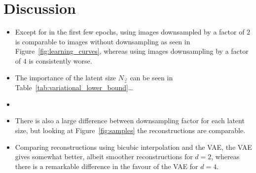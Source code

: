 \section{Discussion}
\label{sec:discussion}

\begin{itemize}
	\item Except for in the first few epochs, using images downsampled by a factor of $2$ is comparable to images without downsampling as seen in Figure~\ref{fig:learning_curves}, whereas using images downsampling by a factor of $4$ is consistently worse.
	\item The importance of the latent size $N_{\vec{z}}$ can be seen in Table~\ref{tab:variational_lower_bound}\dots
	\item {}
	\item There is also a large difference between downsampling factor for each latent size, but looking at Figure~\ref{fig:samples} the reconstructions are comparable.
	\item Comparing reconstructions using bicubic interpolation and the VAE, the VAE gives somewhat better, albeit smoother reconstructions for $d = 2$, whereas there is a remarkable difference in the favour of the VAE for $d = 4$.
\end{itemize}
